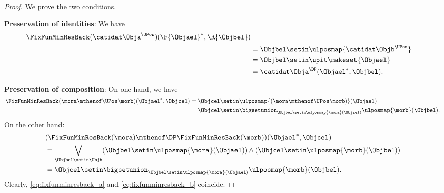 \begin{proof}
    We prove the two conditions.

    \textbf{Preservation of identities}:
    We have
    \begin{equation}
        \begin{aligned}
            \FixFunMinResBack(\catidat\Obja^{\UPos})(\F{\Objael}^*,\R{\Objbel}) \\
             & =
            \Objbel \setin \ulposmap{\catidat\Objb^{\UPos}} \\
             & =\Objbel \setin \upit \makeset{ \Objael} \\
             & =\catidat\Obja^{\DP}(\Objael^*,\Objbel).
        \end{aligned}
    \end{equation}

    \textbf{Preservation of composition}:
    On one hand, we have
    \begin{equation}
        \label{eq:fixfunminresback_a}
        \begin{aligned}
            \FixFunMinResBack(\mora\mthenof\UPos \morb)(\Objael^*,\Objcel) & =
            \Objcel \setin \ulposmap{(\mora \mthenof\UPos \morb)}(\Objael) \\
                                                                           & =\Objcel \setin \bigsetunion_{\Objbel\setin \ulposmap{\mora}(\Objael)}\ulposmap{\morb}(\Objbel).
        \end{aligned}
    \end{equation}
    On the other hand:
    \begin{equation}
        \label{eq:fixfunminresback_b}
        \begin{aligned}
             & (\FixFunMinResBack(\mora)\mthenof\DP \FixFunMinResBack(\morb))(\Objael^*,\Objcel) \\
             & =
            \bigvee_{\Objbel \setin \Objb}(\Objbel \setin \ulposmap{\mora}(\Objael))\wedge (\Objcel\setin \ulposmap{\morb}(\Objbel)) \\
             & =\Objcel \setin \bigsetunion_{\Objbel\setin \ulposmap{\mora}(\Objael)}\ulposmap{\morb}(\Objbel).
        \end{aligned}
    \end{equation}
    Clearly, \cref{eq:fixfunminresback_a} and \cref{eq:fixfunminresback_b} coincide.
\end{proof}

